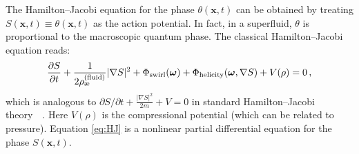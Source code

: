 \documentclass[a4paper,12pt]{article}
\begin{document}
    The Hamilton–Jacobi equation for the phase $\theta(\mathbf{x},t)$ can be obtained by treating $S(\mathbf{x},t) \equiv \theta(\mathbf{x},t)$ as the action potential. In fact, in a superfluid, $\theta$ is proportional to the macroscopic quantum phase. The classical Hamilton–Jacobi equation reads:
    \begin{equation}
        \frac{\partial S}{\partial t} + \frac{1}{2\rho_{\text{\ae}}^{(\text{fluid})}} |\nabla S|^2 + \Phi_{\rm swirl}(\boldsymbol{\omega}) + \Phi_{\rm helicity}(\boldsymbol{\omega},\nabla S) + V(\rho) = 0\,,
        \label{eq:HJ}
    \end{equation}
    which is analogous to $\partial S/\partial t + \frac{|\nabla S|^2}{2m}+V=0$ in standard Hamilton–Jacobi theory~\cite{reference_65}~\cite{reference_66}. Here $V(\rho)$ is the compressional potential (which can be related to pressure). Equation \eqref{eq:HJ} is a nonlinear partial differential equation for the phase $S(\mathbf{x},t)$.
\end{document}
